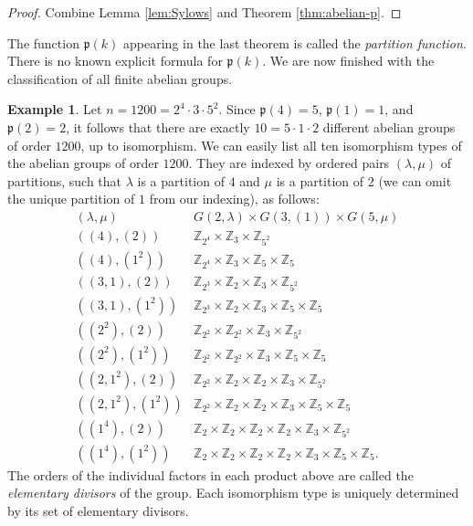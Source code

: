 \documentclass[11pt,oneside]{article}
\theoremstyle{definition}
\newtheorem{example}[thm]{Example}
\newcommand{\Z}{\mathbb{Z}} %
\newcommand{\ptn}{\mathfrak{p}}
\begin{document}
\begin{proof}
Combine Lemma \ref{lem:Sylows} and Theorem \ref{thm:abelian-p}. 
\end{proof}

The function $\ptn(k)$ appearing in the last theorem is called the
\emph{partition function}. There is no known explicit formula for
$\ptn(k)$.  We are now finished with the classification of all finite
abelian groups.


\begin{example}
Let $n = 1200 = 2^4 \cdot 3 \cdot 5^2$. Since $\ptn(4) = 5$,
$\ptn(1)=1$, and $\ptn(2) = 2$, it follows that there are exactly $10
= 5 \cdot 1 \cdot 2$ different abelian groups of order $1200$, up to
isomorphism.  We can easily list all ten isomorphism types of the
abelian groups of order $1200$.  They are indexed by ordered pairs
$(\lambda, \mu)$ of partitions, such that $\lambda$ is a partition of
$4$ and $\mu$ is a partition of $2$ (we can omit the unique partition
of $1$ from our indexing), as follows:
\[
\begin{array}{ll}
  (\lambda, \mu) & G(2,\lambda) \times G(3,(1)) \times G(5,\mu)
  \\ \hline ((4), (2)) & \Z_{2^4} \times \Z_{3} \times \Z_{5^2}
  \\ ((4), (1^2)) & \Z_{2^4} \times \Z_{3} \times \Z_{5} \times \Z_{5}
  \\ ((3,1), (2)) & \Z_{2^3} \times \Z_2 \times \Z_{3} \times \Z_{5^2}
  \\ ((3,1), (1^2)) & \Z_{2^3} \times \Z_2 \times \Z_{3} \times \Z_{5}
  \times \Z_{5} \\ ((2^2), (2)) & \Z_{2^2} \times \Z_{2^2} \times
  \Z_{3} \times \Z_{5^2} \\ ((2^2), (1^2)) & \Z_{2^2} \times \Z_{2^2}
  \times \Z_{3} \times \Z_{5} \times \Z_{5} \\ ((2, 1^2), (2)) &
  \Z_{2^2} \times \Z_{2} \times \Z_{2} \times \Z_{3} \times \Z_{5^2}
  \\ ((2, 1^2), (1^2)) & \Z_{2^2} \times \Z_{2} \times \Z_{2} \times
  \Z_{3} \times \Z_{5} \times \Z_{5} \\ ((1^4), (2)) & \Z_{2} \times
  \Z_{2} \times \Z_{2} \times \Z_{2} \times \Z_{3} \times \Z_{5^2}
  \\ ((1^4), (1^2)) & \Z_{2} \times \Z_{2} \times \Z_{2} \times \Z_{2}
  \times \Z_{3} \times \Z_{5} \times \Z_{5}.
\end{array}
\]
The orders of the individual factors in each product above are called
the \emph{elementary divisors} of the
group.  Each isomorphism type is uniquely determined by its set of
elementary divisors.



\end{example}
\end{document}
